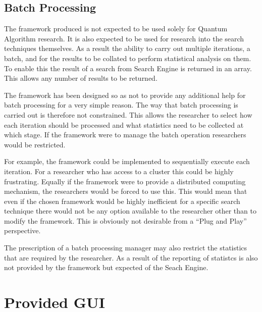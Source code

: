 \subsection{Batch Processing}
The framework produced is not expected to be used solely for Quantum Algorithm research.
It is also expected to be used for research into the search techniques themselves.
As a result the ability to carry out multiple iterations, a batch, and for the results to be collated to perform statistical analysis on them.
To enable this the result of a search from Search Engine is returned in an array.
This allows any number of results to be returned.

The framework has been designed so as not to provide any additional help for batch processing for a very simple reason.
The way that batch processing is carried out is therefore not constrained.
This allows the researcher to select how each iteration should be processed and what statistics need to be collected at which stage.
If the framework were to manage the batch operation researchers would be restricted.

For example, the framework could be implemented to sequentially execute each iteration.
For a researcher who has access to a cluster this could be highly frustrating.
Equally if the framework were to provide a distributed computing mechanism, the researchers would be forced to use this.
This would mean that even if the chosen framework would be highly inefficient for a specific search technique there would not be any option available to the researcher other than to modify the framework.
This is obviously not desirable from a ``Plug and Play'' perspective.

The prescription of a batch processing manager may also restrict the statistics that are required by the researcher.
As a result of the reporting of statistcs is also not provided by the framework but expected of the Seach Engine.

\section{Provided GUI}

